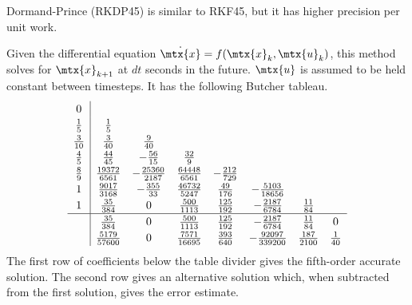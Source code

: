 Dormand-Prince (RKDP45) is similar to RKF45, but it has higher precision per
unit work.
\begin{theorem}
  Given the differential equation $\dot{\mtx{x}} = f(\mtx{x}_k, \mtx{u}_k)$,
  this method solves for $\mtx{x}_{k+1}$ at $dt$ seconds in the future.
  $\mtx{u}$ is assumed to be held constant between timesteps. It has the
  following Butcher tableau.
  \begin{equation*}
    \renewcommand\arraystretch{1.2}
    \begin{array}{c|ccccccc}
      0 \\
      \frac{1}{5} & \frac{1}{5} \\
      \frac{3}{10} & \frac{3}{40} & \frac{9}{40} \\
      \frac{4}{5} & \frac{44}{45} & -\frac{56}{15} & \frac{32}{9} \\
      \frac{8}{9} & \frac{19372}{6561} & -\frac{25360}{2187} &
        \frac{64448}{6561} & -\frac{212}{729} \\
      1 & \frac{9017}{3168} & -\frac{355}{33} & \frac{46732}{5247} &
        \frac{49}{176} & -\frac{5103}{18656} \\
      1 & \frac{35}{384} & 0 & \frac{500}{1113} & \frac{125}{192} &
        -\frac{2187}{6784} & \frac{11}{84} \\
      \hline
      & \frac{35}{384} & 0 & \frac{500}{1113} & \frac{125}{192} &
        -\frac{2187}{6784} & \frac{11}{84} & 0 \\
      & \frac{5179}{57600} & 0 & \frac{7571}{16695} & \frac{393}{640} &
        -\frac{92097}{339200} & \frac{187}{2100} & \frac{1}{40}
    \end{array}
  \end{equation*}
  The first row of coefficients below the table divider gives the fifth-order
  accurate solution. The second row gives an alternative solution which,
  when subtracted from the first solution, gives the error estimate.
\end{theorem}
